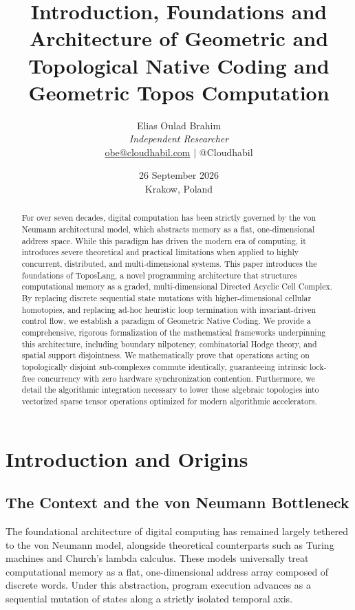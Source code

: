 \documentclass[11pt, a4paper]{article}
\title{\textbf{Introduction, Foundations and Architecture of Geometric and Topological Native Coding and Geometric Topos Computation}}
\author{
    Elias Oulad Brahim \\
    \textit{Independent Researcher} \\
    \href{mailto:obe@cloudhabil.com}{obe@cloudhabil.com} $\mid$ @Cloudhabil
}
\date{26 September 2026 \vspace{0.2cm} \\ Krakow, Poland}
\begin{document}
\maketitle

\begin{abstract}
    For over seven decades, digital computation has been strictly governed by the von Neumann architectural model, which abstracts memory as a flat, one-dimensional address space. While this paradigm has driven the modern era of computing, it introduces severe theoretical and practical limitations when applied to highly concurrent, distributed, and multi-dimensional systems. This paper introduces the foundations of ToposLang, a novel programming architecture that structures computational memory as a graded, multi-dimensional Directed Acyclic Cell Complex. By replacing discrete sequential state mutations with higher-dimensional cellular homotopies, and replacing ad-hoc heuristic loop termination with invariant-driven control flow, we establish a paradigm of Geometric Native Coding. We provide a comprehensive, rigorous formalization of the mathematical frameworks underpinning this architecture, including boundary nilpotency, combinatorial Hodge theory, and spatial support disjointness. We mathematically prove that operations acting on topologically disjoint sub-complexes commute identically, guaranteeing intrinsic lock-free concurrency with zero hardware synchronization contention. Furthermore, we detail the algorithmic integration necessary to lower these algebraic topologies into vectorized sparse tensor operations optimized for modern algorithmic accelerators.
\end{abstract}

\tableofcontents
\newpage

\section{Introduction and Origins}

\subsection{The Context and the von Neumann Bottleneck}
The foundational architecture of digital computing has remained largely tethered to the von Neumann model, alongside theoretical counterparts such as Turing machines and Church's lambda calculus. These models universally treat computational memory as a flat, one-dimensional address array composed of discrete words. Under this abstraction, program execution advances as a sequential mutation of states along a strictly isolated temporal axis.
\end{document}
